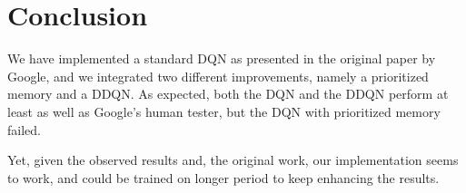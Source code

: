 \documentclass[letterpaper]{article}
\begin{document}
\section{Conclusion}

We have implemented a standard DQN as presented in the original paper by Google, and we integrated two different improvements, namely a prioritized memory and a DDQN.
As expected, both the DQN and the DDQN perform at least as well as Google's human tester, but the DQN with prioritized memory failed.

Yet, given the observed results and, the original work, our implementation seems to work, and could be trained on longer period to keep enhancing the results.

\newpage
\footnotesize


\end{document}

